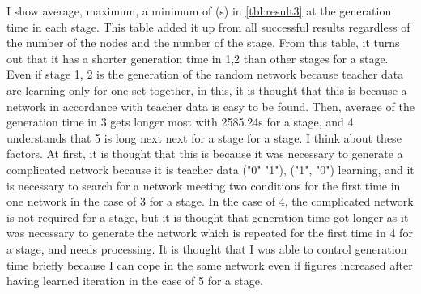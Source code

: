 \documentclass{article}
\begin{document}
I show average, maximum, a minimum of (s) in \ref{tbl:result3} at the generation time in each stage.
This table added it up from all successful results regardless of the number of the nodes and the number of the stage.
From this table, it turns out that it has a shorter generation time in 1,2 than other stages for a stage.
Even if stage 1, 2 is the generation of the random network because teacher data are learning only for one set together, in this, it is thought that this is because a network in accordance with teacher data is easy to be found.
Then, average of the generation time in 3 gets longer most with 2585.24s for a stage, and 4 understands that 5 is long next next for a stage for a stage.
I think about these factors.
At first, it is thought that this is because it was necessary to generate a complicated network because it is teacher data ("0" "1"), ("1", "0") learning, and it is necessary to search for a network meeting two conditions for the first time in one network in the case of 3 for a stage.
In the case of 4, the complicated network is not required for a stage, but it is thought that generation time got longer as it was necessary to generate the network which is repeated for the first time in 4 for a stage, and needs processing.
It is thought that I was able to control generation time briefly because I can cope in the same network even if figures increased after having learned iteration in the case of 5 for a stage.
\end{document}
